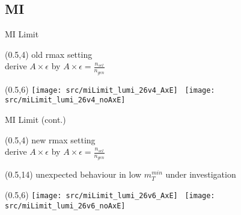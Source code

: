 
\subsection{MI}
\begin{frame}{MI Limit}
    \begin{textblock}{15}(0.5,4)
        \centering
        old rmax setting\\
        derive $A\times \epsilon$ by $A\times \epsilon=\frac{n_{sel}}{n_{gen}}$
    \end{textblock}

        \begin{textblock}{15}(0.5,6)
            \texttt{[image: src/miLimit\_lumi\_26v4\_AxE]}~
            \texttt{[image: src/miLimit\_lumi\_26v4\_noAxE]}
        \end{textblock}
\end{frame}
\begin{frame}{MI Limit (cont.)}
    \begin{textblock}{15}(0.5,4)
    \centering
        new rmax setting\\
        derive $A\times \epsilon$ by $A\times \epsilon=\frac{n_{sel}}{n_{gen}}$
    \end{textblock}
    \begin{textblock}{15}(0.5,14)
    \centering
        unexpected behaviour in low $m_T^{min}$ under investigation
    \end{textblock}

        \begin{textblock}{15}(0.5,6)
            \texttt{[image: src/miLimit\_lumi\_26v6\_AxE]}~
            \texttt{[image: src/miLimit\_lumi\_26v6\_noAxE]}
        \end{textblock}
\end{frame}